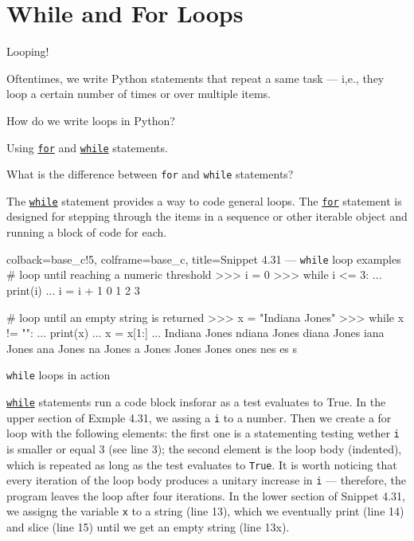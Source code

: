 \documentclass[a4paper,11pt]{book}
\numberwithin{figure}{chapter}
\numberwithin{table}{chapter}
\newcommand{\question}[1]{%
    \begin{tcolorbox}[colback=comp_c!10,colframe=comp_c,sidebyside align=top,width=\linewidth,before skip=1ex]
        #1
    \end{tcolorbox}%
    \switchcolumn%
}
\newcommand{\note}[1]{%
    \begin{tcolorbox}[colback=white!0,colframe=white!10,width=\linewidth,before skip=1ex]
        #1
    \end{tcolorbox}         
}
\begin{document}
\section{While and For Loops}
\label{sec:while_and_for_loops}

\begin{paracol}{2}
	\question{\raggedright Looping!}
	\note{Oftentimes, we write Python statements that repeat a same task --- i,e., they loop a certain number of times or over multiple items.}
\end{paracol}

\begin{paracol}{2}
	\question{\raggedright How do we write loops in Python?}
	\note{Using \href{https://docs.python.org/3/reference/compound_stmts.html#for}{\texttt{for}} and \href{https://docs.python.org/3/reference/compound_stmts.html#while}{\texttt{while}} statements.}
\end{paracol}

\begin{paracol}{2}
	\question{\raggedright What is the difference between \texttt{for} and \texttt{while} statements?}
	\note{The \href{https://docs.python.org/3/reference/compound_stmts.html#while}{\texttt{while}} statement provides a way to code general loops. The \href{https://docs.python.org/3/reference/compound_stmts.html#for}{\texttt{for}} statement is designed for stepping through the items in a sequence or other iterable object and running a block of code for each.}
\end{paracol}

\begin{pythoncode}[linenos=true,]{colback=base_c!5, colframe=base_c, title=\sffamily Snippet 4.31 --- \texttt{while} loop examples}
# loop until reaching a numeric threshold
>>> i = 0
>>> while i <= 3:
...     print(i)
...     i = i + 1
0
1
2
3

# loop until an empty string is returned
>>> x = "Indiana Jones"
>>> while x != "":
...     print(x)
...     x = x[1:]
... 
Indiana Jones
ndiana Jones
diana Jones
iana Jones
ana Jones
na Jones
a Jones
 Jones
Jones
ones
nes
es
s
\end{pythoncode}
\clearpage

\begin{paracol}{2}
	\question{\raggedright \texttt{while} loops in action}
	\note{\href{https://docs.python.org/3/reference/compound_stmts.html#while}{\texttt{while}} statements run a code block insforar as a test evaluates to True. In the upper section of Exmple 4.31, we assing a \texttt{i} to a number. Then we create a for loop with the following elements: the first one is a statementing testing wether \texttt{i} is smaller or equal 3 (see line 3); the second element is the loop body (indented), which is repeated as long as the test evaluates to \texttt{True}. It is worth noticing that every iteration of the loop body produces a unitary increase in \texttt{i} --- therefore, the program leaves the loop after four iterations. In the lower section of Snippet 4.31, we assigng the variable \texttt{x} to a string (line 13), which we eventually print (line 14) and  slice (line 15) until we get an empty string (line 13x).}
\end{paracol}
\end{document}
